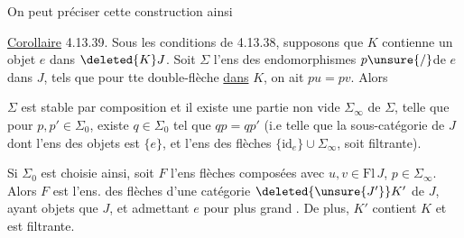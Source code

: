 On peut préciser cette construction ainsi

\uline{Corollaire} 4.13.39. Sous les conditions de 4.13.38, supposons que $K$ contienne un objet $e$  dans $\deleted{K}J$. Soit $\Sigma$ l'ens des endomorphismes $p\unsure{/}$de $e$ dans $J$, tels que
pour tte double-flèche  \uline{dans} $K$, on
ait $pu=pv$.  Alors

 $\Sigma$ est stable par composition et il existe une partie non vide $\Sigma_{\infty}$ de $\Sigma$, telle que  pour  $p,p'\in\Sigma_0$, existe
$q\in\Sigma_0$ tel que $qp=qp'$ (i.e telle que la sous-catégorie  de $J$ dont l'ens des objets est $\{e\}$, et l'ens des flèches $\{\mathrm{id}_e\}\cup\Sigma_{\infty}$, soit filtrante).

Si $\Sigma_0$ est choisie ainsi, soit $F$ l'ens   flèches  composées
avec $u,v\in\mathrm{Fl}\,J$, $p\in\Sigma_{\infty}$. Alors $F$ est l'ens. des flèches d'une catégorie $\deleted{\unsure{J'}}K'$ de $J$, ayant  objets que $J$,  et admettant $e$ pour plus grand . De plus, $K'$ contient $K$ et est filtrante.


